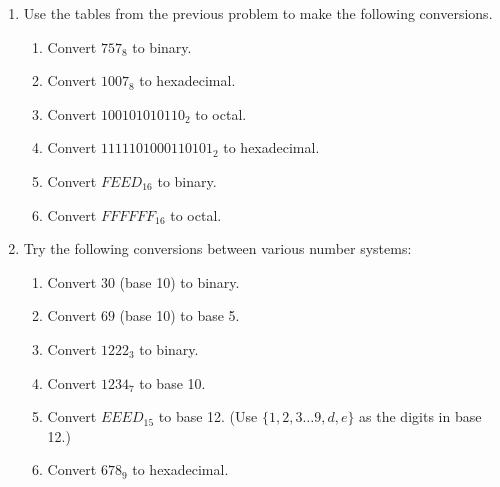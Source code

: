 \begin{enumerate}
{\vfill

}

\hintspagebreak
\workbookpagebreak
\textbookpagebreak

\item Use the tables from the previous problem to make the following conversions.

\begin{enumerate}
\item Convert $757_8$ to binary.
\item Convert $1007_8$ to hexadecimal.
\item Convert $100101010110_2$ to octal.
\item Convert $1111101000110101_2$ to hexadecimal.
\item Convert $FEED_{16}$ to binary.
\item Convert $FFFFFF_{16}$ to octal.
\end{enumerate}


\wbvfill

\item Try the following conversions between various number systems:

\begin{enumerate}
\item Convert $30$ (base 10) to binary. 
\item Convert $69$ (base 10) to base 5. 
\item Convert $1222_3$ to binary.
\item Convert $1234_7$ to base 10.
\item Convert $EEED_{15}$ to base 12. (Use $\{1, 2, 3 \ldots 9, d, e\}$ as the digits in base 12.) 
\item Convert $678_{9}$ to hexadecimal. 
\end{enumerate}




\end{enumerate}
